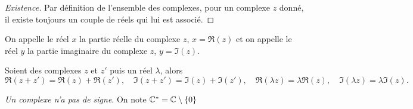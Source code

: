 \begin{proof}[Existence]
  Par définition de l'ensemble des complexes, pour un complexe \(z\) donné, il existe toujours un couple de réels qui lui est associé.
\end{proof}
%
On appelle le réel \(x\) la partie réelle du complexe \(z\), \(x=\Re(z)\) et on appelle le réel \(y\) la partie imaginaire du complexe \(z\), \(y=\Im(z)\).
%
\begin{prop}
  Soient des complexes \(z\) et \(z'\) puis un réel \(\lambda\), alors
  \begin{equation}
      \Re(z+z')=\Re(z)+\Re(z'), \quad \Im(z+z')=\Im(z)+\Im(z'), \quad \Re(\lambda z)=\lambda \Re(z), \quad \Im(\lambda z)=\lambda \Im(z).
  \end{equation}
\end{prop}
%
\emph{Un complexe n'a pas de signe}. On note \(\mathbb{C}^*=\mathbb{C} \setminus \{0\}\)
%
